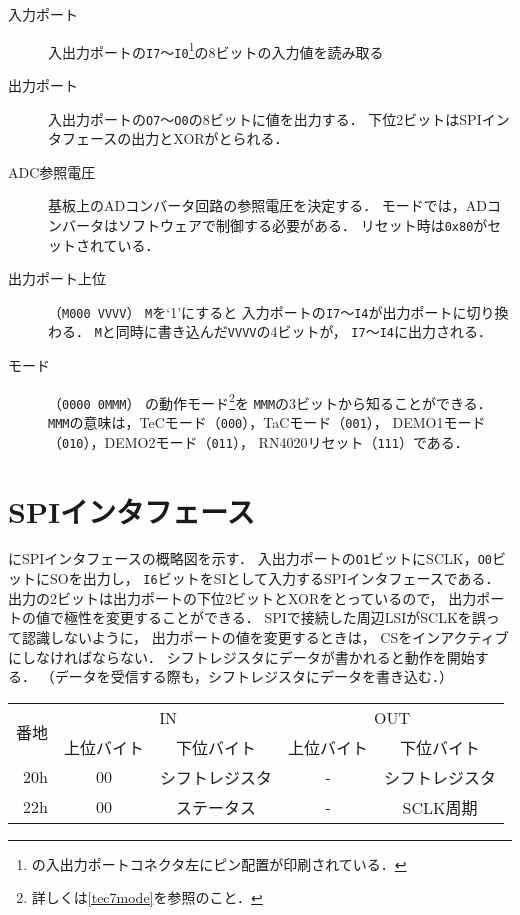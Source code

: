 \begin{description}
\item[入力ポート]
  入出力ポートの\texttt{I7}〜\texttt{I0}\footnote{
    の入出力ポートコネクタ左にピン配置が印刷されている．
  }の8ビットの入力値を読み取る
\item[出力ポート]
  入出力ポートの\texttt{O7}〜\texttt{O0}の8ビットに値を出力する．
  下位2ビットはSPIインタフェースの出力とXORがとられる．
\item[ADC参照電圧]
  {\tecS}基板上のADコンバータ回路の参照電圧を決定する．
  {\tac}モードでは，ADコンバータはソフトウェアで制御する必要がある．
  リセット時は\texttt{0x80}がセットされている．
\item[出力ポート上位]（\texttt{M000 VVVV}）
  \texttt{M}を`1'にすると
  入力ポートの\texttt{I7}〜\texttt{I4}が出力ポートに切り換わる．
  \texttt{M}と同時に書き込んだ\texttt{VVVV}の4ビットが，
  \texttt{I7}〜\texttt{I4}に出力される．
\item[モード]（\texttt{0000 0MMM}）
  {\tecS}の動作モード\footnote{詳しくは\ref{tec7mode}を参照のこと．}を
  \texttt{MMM}の3ビットから知ることができる．
  \texttt{MMM}の意味は，TeCモード（\texttt{000}），TaCモード（\texttt{001}），
  DEMO1モード（\texttt{010}），DEMO2モード（\texttt{011}），
  RN4020リセット（\texttt{111}）である．
\end{description}

\section{SPIインタフェース}

にSPIインタフェースの概略図を示す．
入出力ポートの\texttt{O1}ビットにSCLK，\texttt{O0}ビットにSOを出力し，
\texttt{I6}ビットをSIとして入力するSPIインタフェースである．
出力の2ビットは出力ポートの下位2ビットとXORをとっているので，
出力ポートの値で極性を変更することができる．
SPIで接続した周辺LSIがSCLKを誤って認識しないように，
出力ポートの値を変更するときは，
CSをインアクティブにしなければならない．
シフトレジスタにデータが書かれると動作を開始する．
（データを受信する際も，シフトレジスタにデータを書き込む．）


\begin{center}
  \small\begin{tabular}{| r | c | c || c | c |}\hline
    \multirow{2}{*}{番地}
    & \multicolumn{2}{|c||}{IN}
    & \multicolumn{2}{c|}{OUT}
    \\\cline{2-5}
         & 上位バイト & 下位バイト & 上位バイト & 下位バイト
    \\\hline\hline
    20h  &  00 & シフトレジスタ
         &  -  & シフトレジスタ \\\hline
    22h  &  00 & ステータス
         &  -  & SCLK周期       \\\hline
  \end{tabular}
\end{center}

